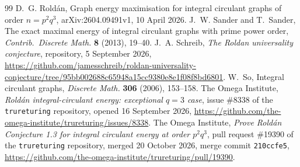 \documentclass[11pt]{article}
\theoremstyle{remark}
\begin{document}
\begin{thebibliography}{99}
D.~G. Rold\'an, Graph energy maximisation for integral circulant graphs of
order $n=p^2q^3$, arXiv:2604.09491v1, 10 April 2026.
J.~W. Sander and T.~Sander, The exact maximal energy of integral circulant
graphs with prime power order, \emph{Contrib.\ Discrete Math.} \textbf{8}
(2013), 19--40.
J.~A. Schreib, \emph{The Roldan universality conjecture}, repository, 5
September 2026,
\url{https://github.com/jamesschreib/roldan-universality-conjecture/tree/95bb002688c65948a15cc9380e8e1f08f8bd6801}.
W.~So, Integral circulant graphs, \emph{Discrete Math.} \textbf{306} (2006),
153--158.
The Omega Institute, \emph{Rold\'an integral-circulant energy: exceptional
$q=3$ case}, issue \#8338 of the \texttt{trureturing} repository, opened 16
September 2026,
\url{https://github.com/the-omega-institute/trureturing/issues/8338}.
The Omega Institute, \emph{Prove Rold\'an Conjecture 1.3 for integral circulant
energy at order $p^2q^3$}, pull request \#19390 of the \texttt{trureturing}
repository, merged 20 October 2026, merge commit \texttt{210ccfe5},
\url{https://github.com/the-omega-institute/trureturing/pull/19390}.
\end{thebibliography}
\end{document}
